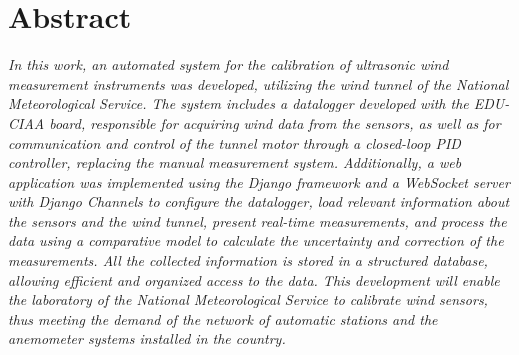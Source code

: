 \chapter*{Abstract}
\textit{In this work, an automated system for the calibration of ultrasonic wind measurement instruments was developed, utilizing the wind tunnel of the National Meteorological Service. The system includes a datalogger developed with the EDU-CIAA board, responsible for acquiring wind data from the sensors, as well as for communication and control of the tunnel motor through a closed-loop PID controller, replacing the manual measurement system. Additionally, a web application was implemented using the Django framework and a WebSocket server with Django Channels to configure the datalogger, load relevant information about the sensors and the wind tunnel, present real-time measurements, and process the data using a comparative model to calculate the uncertainty and correction of the measurements. All the collected information is stored in a structured database, allowing efficient and organized access to the data. This development will enable the laboratory of the National Meteorological Service to calibrate wind sensors, thus meeting the demand of the network of automatic stations and the anemometer systems installed in the country.}